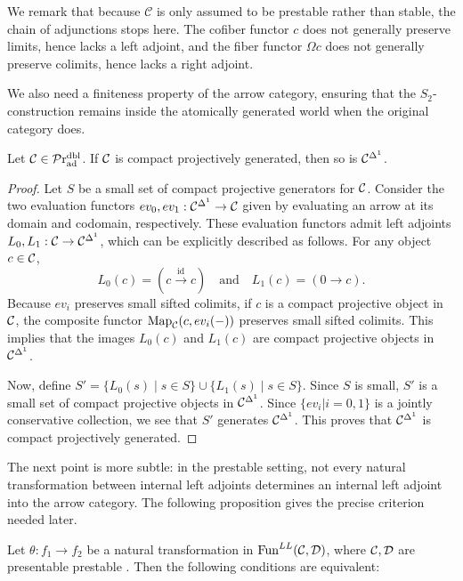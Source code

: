 \documentclass[a4paper,10pt, oneside]{amsart}
\begin{document}
\begin{rem}
 We remark that because $\mathcal{C}$ is only assumed to be prestable rather than stable, the chain of adjunctions stops here. The cofiber functor $c$ does not generally preserve limits, hence lacks a left adjoint, and the fiber functor $\Omega c$ does not generally preserve colimits, hence lacks a right adjoint.
\end{rem}
We also need a finiteness property of the arrow category, ensuring that the \(S_2\)-construction remains inside the atomically generated world when the original category does.
\begin{prop}
	Let $\mathcal{C}\in\mathcal{P}\mathrm{r}_{\mathrm{ad}}^{\mathrm{dbl}}$.	If $\mathcal{C}$ is compact projectively generated, then so is $\mathcal{C}^{\Delta^1}$.
\end{prop}
\begin{proof}
	Let $S$ be a small set of compact projective generators for $\mathcal{C}$. Consider the two evaluation functors $ev_0, ev_1: \mathcal{C}^{\Delta^1} \to \mathcal{C}$ given by evaluating an arrow at its domain and codomain, respectively. 
	These evaluation functors admit left adjoints $L_0, L_1: \mathcal{C} \to \mathcal{C}^{\Delta^1}$, which can be explicitly described as follows. For any object $c \in \mathcal{C}$,
	$$ L_0(c) = (c \xrightarrow{\operatorname{id}} c) \quad \text{and} \quad L_1(c) = (0 \to c). $$
	Because $ev_i$ preserves small sifted colimits, if $c$ is a compact projective object in $\mathcal{C}$, the composite functor $\operatorname{Map}_\mathcal{C}(c, ev_i(-))$ preserves small sifted colimits. This implies that the images $L_0(c)$ and $L_1(c)$ are compact projective objects in $\mathcal{C}^{\Delta^1}$.
	
	Now, define $S' = \{ L_0(s) \mid s \in S \} \cup \{ L_1(s) \mid s \in S \}$. Since $S$ is small, $S'$ is a small set of compact projective objects in $\mathcal{C}^{\Delta^1}$. Since $\{ev_i|i=0,1\}$ is a jointly conservative collection, we see that $S'$ generates $\mathcal{C}^{\Delta^1}$. 
This proves that $\mathcal{C}^{\Delta^1}$ is compact projectively generated.
\end{proof}
The next point is more subtle: in the prestable setting, not every natural transformation between internal left adjoints determines an internal left adjoint into the arrow category. The following proposition gives the precise criterion needed later.
\begin{prop}\label{dualaddintervalpower}
	Let $\theta:f_1\to f_2$ be a natural transformation in $\operatorname{Fun}^{LL}(\mathcal{C},\mathcal{D})$, where $\mathcal{C}, \mathcal{D}$ are presentable prestable \infcats. Then the following conditions are equivalent:
\end{prop}
\end{document}
